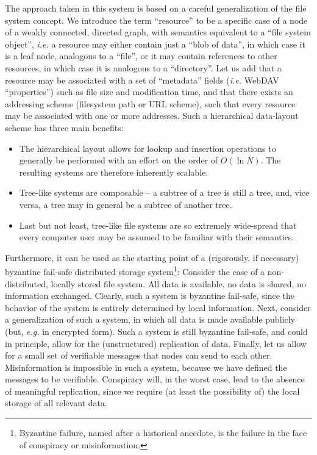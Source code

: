 \documentclass[11pt]{article}
\begin{document}
\begin{mainmatter}
The approach taken in this system is based on a careful generalization of the file system concept. 
We introduce the term ``resource'' to be a specific case of a node of a weakly connected, directed graph, with semantics equivalent to a ``file system object'', \emph{i.e.} a resource may either contain just a ``blob of data'', in which case it is a leaf node, analogous to a ``file'', or it may contain references to other resources, in which case it is analogous to a ``directory''. Let us add that a resource may be associated with a set of ``metadata'' fields (\emph{i.e.} WebDAV ``properties'') such as file size and modification time, and that there exists an addressing scheme (filesystem path or URL scheme), such that every resource may be associated with one or more addresses. Such a hierarchical data-layout scheme has three main benefits:
\begin{itemize}
\item The hierarchical layout allows for lookup and insertion operations to generally be performed with an effort on the order of $O(\ln N)$. The resulting systems are therefore inherently scalable.
\item Tree-like systems are composable -- a subtree of a tree is still a tree, and, vice versa, a tree may in general be a subtree of another tree.
\item Last but not least, tree-like file systems are so extremely wide-spread that every computer user may be assumed to be familiar with their semantics.
\end{itemize}

Furthermore, it can be used as the starting point of a (rigorously, if necessary) byzantine fail-safe distributed storage system\footnote{Byzantine failure, named after a historical anecdote, is the failure in the face of conspiracy or misinformation.}: Consider the case of a non-distributed, locally stored file system. All data is available, no data is shared, no information exchanged. Clearly, such a system is byzantine fail-safe, since the behavior of the system is entirely determined by local information. Next, consider a generalization of such a system, in which all data is made available publicly (but, \emph{e.g.} in encrypted form). Such a system is still byzantine fail-safe, and could in principle, allow for the (unstructured) replication of data. Finally, let us allow for a small set of verifiable messages that nodes can send to each other. Misinformation is impossible in such a system, because we have defined the messages to be verifiable. Conspiracy will, in the worst case, lead to the absence of meaningful replication, since we require (at least the possibility of) the local storage of all relevant data.


\end{mainmatter}
\end{document}
